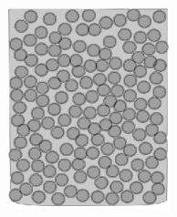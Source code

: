 \documentclass[usenames,dvipsnames]{beamer}
\begin{document}
\begin{frame}
\begin{columns}
\includegraphics[width=0.8\textwidth]{img/proceso/proceso3.eps}
\end{columns}
\end{frame}
\end{document}
